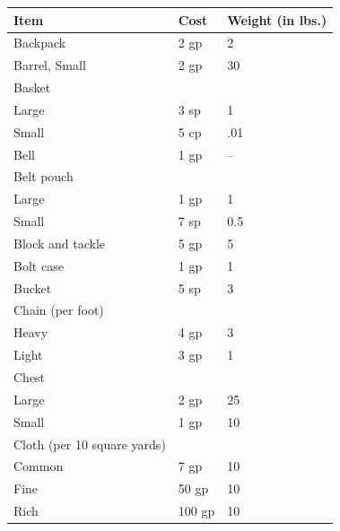 \begin{multicols}{2}
\begin{minipage}{\columnwidth}
\end{minipage}

\noindent
\begin{minipage}{\columnwidth}

\label{miscequip}
\noindent
\begin{tabular}{|p{}|p{}|p{}|}
\hline
Item	& Cost	& Weight (in lbs.)\\
\hline\hline
\rowcolor[gray]{.9}Backpack		& 2 gp	& 2 \\
Barrel, Small	& 2 gp	& 30 \\
\rowcolor[gray]{.9}Basket			& 	& \\
\rowcolor[gray]{.9}\hspace{1em}Large			& 3 sp	& 1 \\
\hspace{1em}Small			& 5 cp	& .01 \\
\rowcolor[gray]{.9}Bell			& 1 gp	& -- \\
Belt pouch		& 	& \\
\hspace{1em}Large			& 1 gp	& 1 \\
\rowcolor[gray]{.9}\hspace{1em}Small			& 7 sp	& 0.5 \\
Block and tackle	& 5 gp	& 5 \\
\rowcolor[gray]{.9}Bolt case		& 1 gp	& 1 \\
Bucket			& 5 sp	& 3 \\
\rowcolor[gray]{.9}Chain (per foot)	& 	& \\
\rowcolor[gray]{.9}\hspace{1em}Heavy			& 4 gp	& 3 \\
\hspace{1em}Light			& 3 gp	& 1 \\
\rowcolor[gray]{.9}Chest			& 	& \\
\rowcolor[gray]{.9}\hspace{1em}Large			& 2 gp	& 25 \\
\hspace{1em}Small			& 1 gp	& 10 \\
\rowcolor[gray]{.9}Cloth (per 10 square yards)	& 	& \\
\rowcolor[gray]{.9}\hspace{1em}Common		& 7 gp	& 10 \\
\hspace{1em}Fine			& 50 gp	& 10 \\
\rowcolor[gray]{.9}\hspace{1em}Rich			& 100 gp	& 10 \\

\end{tabular}
\end{minipage}
\end{multicols}
